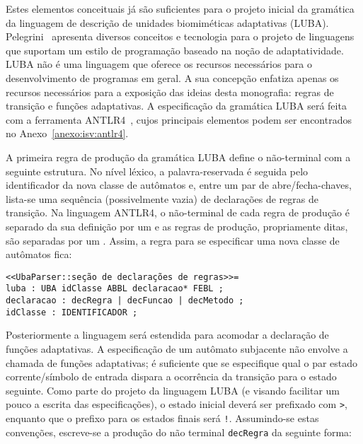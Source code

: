 
Estes elementos conceituais já são suficientes para o projeto inicial da gramática da linguagem de descrição de unidades biomiméticas adaptativas (LUBA). Pelegrini~\cite{pelegrini:2009} apresenta diversos conceitos e tecnologia para o projeto de linguagens que suportam um estilo de programação baseado na noção de adaptatividade. LUBA não é uma linguagem que oferece os recursos necessários para o desenvolvimento de programas em geral. A sua concepção enfatiza apenas os recursos necessários para a exposição das ideias desta monografia: regras de transição e funções adaptativas. A especificação da gramática LUBA será feita com a ferramenta ANTLR4~\cite{parr:2013}, cujos principais elementos podem ser encontrados no Anexo~\ref{anexo:isv:antlr4}.

A primeira regra de produção da gramática LUBA define o não-terminal  com a seguinte estrutura. No nível léxico, a palavra-reservada  é seguida pelo identificador da nova classe de autômatos e, entre um par de abre/fecha-chaves, lista-se uma sequência (possivelmente vazia) de declarações de regras de transição. Na linguagem ANTLR4, o não-terminal de cada regra de produção é separado da sua definição por um \terminal{:} e as regras de produção, propriamente ditas, são separadas por um \terminal{;}. Assim, a regra para se especificar uma nova classe de autômatos  fica:

\begin{lstlisting}[style=antlr]
<<UbaParser::seção de declarações de regras>>=
luba : UBA idClasse ABBL declaracao* FEBL ;
declaracao : decRegra | decFuncao | decMetodo ;
idClasse : IDENTIFICADOR ;
\end{lstlisting}

Posteriormente a linguagem será estendida para acomodar a declaração de funções adaptativas. A especificação de um autômato subjacente não envolve a chamada de funções adaptativas; é suficiente que se especifique qual o par estado corrente/símbolo de entrada dispara a ocorrência da transição para o estado seguinte. Como parte do projeto da linguagem LUBA (e visando facilitar um pouco a escrita das especificações), o estado inicial deverá ser prefixado com \lstinline[style=antlr]'>', enquanto que o prefixo para os estados finais será \lstinline[style=antlr]'!'. Assumindo-se estas convenções, escreve-se a produção do não terminal \lstinline[style=antlr]!decRegra! da seguinte forma:

